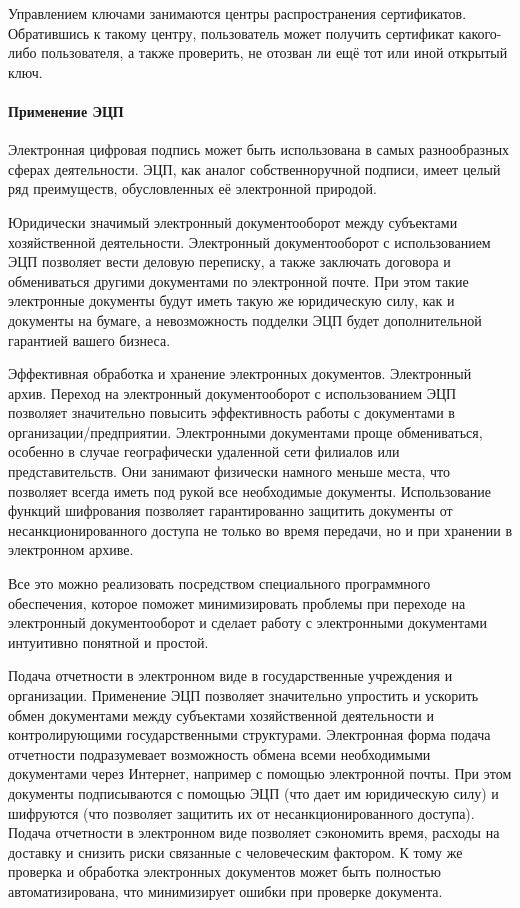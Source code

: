 Управлением ключами занимаются центры распространения сертификатов.
Обратившись к такому центру, пользователь может получить сертификат
какого-либо пользователя, а также проверить, не отозван ли ещё тот или иной
открытый ключ.

\paragraph{Применение ЭЦП}
Электронная цифровая подпись может быть использована в самых разнообразных
сферах деятельности. ЭЦП, как аналог собственноручной подписи, имеет целый
ряд преимуществ, обусловленных её электронной природой.

\begin{Notes}
  \item Юридически значимый электронный документооборот между субъектами хозяйственной деятельности. Электронный документооборот с использованием ЭЦП позволяет вести деловую переписку, а также заключать договора и обмениваться другими документами по электронной почте. При этом такие электронные документы будут иметь такую же юридическую силу, как и документы на бумаге, а невозможность подделки ЭЦП будет дополнительной гарантией вашего бизнеса.
  \item Эффективная обработка и хранение электронных документов. Электронный архив. Переход на электронный документооборот с использованием ЭЦП позволяет значительно повысить эффективность работы с документами в организации/предприятии. Электронными документами проще обмениваться, особенно в случае географически удаленной сети филиалов или представительств. Они занимают физически намного меньше места, что позволяет всегда иметь под рукой все необходимые документы. Использование функций шифрования позволяет гарантированно защитить документы от несанкционированного доступа не только во время передачи, но и при хранении в электронном архиве.
  \item Все это можно реализовать посредством специального программного обеспечения, которое поможет минимизировать проблемы при переходе на электронный документооборот и сделает работу с электронными документами интуитивно понятной и простой.
  \item Подача отчетности в электронном виде в государственные учреждения и организации. Применение ЭЦП позволяет значительно упростить и ускорить обмен документами между субъектами хозяйственной деятельности и контролирующими государственными структурами. Электронная форма подача отчетности подразумевает возможность обмена всеми необходимыми документами через Интернет, например с помощью электронной почты. При этом документы подписываются с помощью ЭЦП (что дает им юридическую силу) и шифруются (что позволяет защитить их от несанкционированного доступа). Подача отчетности в электронном виде позволяет сэкономить время, расходы на доставку и снизить риски связанные с человеческим фактором. К тому же проверка и обработка электронных документов может быть полностью автоматизирована, что минимизирует ошибки при проверке документа.

\end{Notes}
